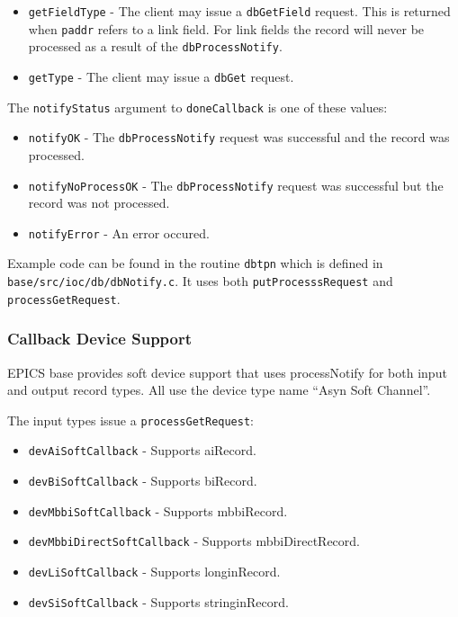 \begin{itemize}
\item \verb|getFieldType| - The client may issue a \verb|dbGetField| request.
This is returned when \verb|paddr| refers to a link field.
For link fields the record will never be processed as a result of the \verb|dbProcessNotify|.

\item \verb|getType| - The client may issue a \verb|dbGet| request.
\end{itemize}

The \verb|notifyStatus| argument to \verb|doneCallback|  is one of these values:

\begin{itemize}
\item \verb|notifyOK| - The \verb|dbProcessNotify| request was successful and the record was processed.
\item \verb|notifyNoProcessOK| - The \verb|dbProcessNotify| request was successful but the record was not processed.
\item \verb|notifyError| - An error occured.
\end{itemize}

Example code can be found in the routine \verb|dbtpn| which is defined in \verb|base/src/ioc/db/dbNotify.c|. It uses both \verb|putProcesssRequest| and \verb|processGetRequest|.

\subsubsection{Callback Device Support}

EPICS base provides soft device support that uses processNotify for both input and output record types. All use the device type name ``Asyn Soft Channel''.

The input types issue a \verb|processGetRequest|:
\begin{itemize}
\item \verb|devAiSoftCallback| - Supports aiRecord.
\item \verb|devBiSoftCallback| - Supports biRecord.
\item \verb|devMbbiSoftCallback| - Supports mbbiRecord.
\item \verb|devMbbiDirectSoftCallback| - Supports mbbiDirectRecord.
\item \verb|devLiSoftCallback| - Supports longinRecord.
\item \verb|devSiSoftCallback| - Supports stringinRecord.
\end{itemize}

